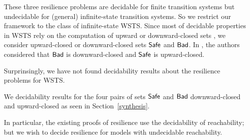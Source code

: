 These three resilience problems are decidable for finite transition systems but undecidable for (general) infinite-state transition systems. So we restrict our framework to the class of infinite-state WSTS. Since most of decidable properties in WSTS rely on the computation of upward or downward-closed sets \cite{DBLP:journals/iandc/AbdullaCJT00, DBLP:journals/tcs/FinkelS01}, we consider upward-closed or downward-closed sets $\textsf{Safe}$ and $\textsf{Bad}$. In \cite{DBLP:journals/corr/abs-2108-00889}, the authors considered that $\textsf{Bad}$ is downward-closed and $\textsf{Safe}$ is upward-closed.

Surprinsingly, we have not found decidability results about the resilience problems for WSTS.

%		
We  
decidability results for the four pairs of sets $\textsf{Safe}$ and $\textsf{Bad}$ downward-closed and upward-closed as seen in Section~\ref{synthesis}.

In particular, the existing proofs of resilience use the decidability of reachability; but we wish to decide resilience for models with undecidable reachability.
%





\iffalse

\begin{proposition}\label{general}
\textcolor{red}{
$\mathscr{S}=(S,\rightarrow,\leq)$ is %
(\Bad,\Safe)-bounded-resilient iff $\mathscr{S}=(S,\rightarrow,\leq)$ is %
(\Bad,\Safe)-resilient (CONJECTURE FOR NOW)
}
\end{proposition}

\begin{proof}
Resilient means that ...
\end{proof}

\fi






